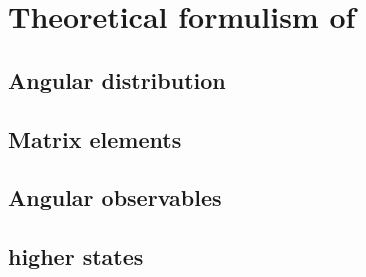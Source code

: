 \chapter{Theoretical formulism of \BdToKstmm}

\section{Angular distribution}

 \section{Matrix elements}

\section{Angular observables}

\section{higher \Kstarzj states}